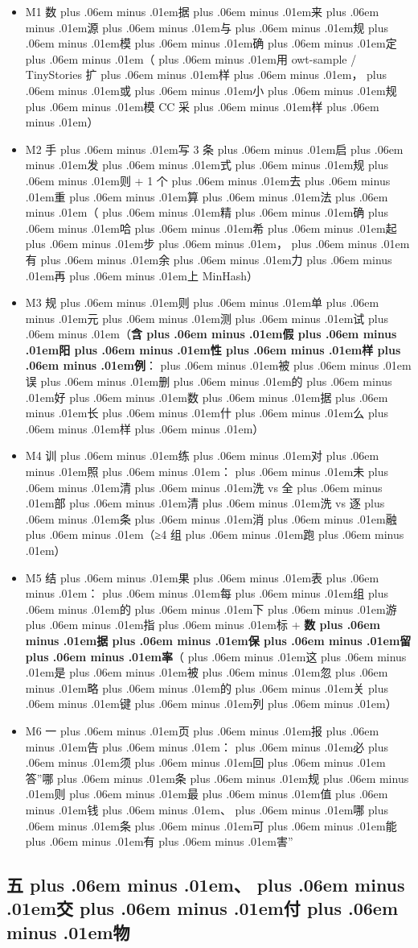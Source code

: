 \documentclass[
]{article}
\providecommand{\tightlist}{%
  \setlength{\itemsep}{0pt}\setlength{\parskip}{0pt}}
\def\zh#1{{\zhfont #1}}
\def\sym#1{{\symfont #1}}
\def\zhglue{\hskip0pt plus .06em minus .01em}
\begin{document}
\begin{itemize}
\tightlist
\item[$\square$]
  M1 \zh{数\zhglue 据\zhglue 来\zhglue 源\zhglue 与\zhglue 规\zhglue 模\zhglue 确\zhglue 定\zhglue （\zhglue 用} owt-sample / TinyStories \zh{扩\zhglue 样\zhglue ，\zhglue 或\zhglue 小\zhglue 规\zhglue 模} CC \zh{采\zhglue 样\zhglue ）}
\item[$\square$]
  M2 \zh{手\zhglue 写} 3 \zh{条\zhglue 启\zhglue 发\zhglue 式\zhglue 规\zhglue 则} + 1 \zh{个\zhglue 去\zhglue 重\zhglue 算\zhglue 法\zhglue （\zhglue 精\zhglue 确\zhglue 哈\zhglue 希\zhglue 起\zhglue 步\zhglue ，\zhglue 有\zhglue 余\zhglue 力\zhglue 再\zhglue 上} MinHash\zh{）}
\item[$\square$]
  M3 \zh{规\zhglue 则\zhglue 单\zhglue 元\zhglue 测\zhglue 试\zhglue （}\textbf{\zh{含\zhglue 假\zhglue 阳\zhglue 性\zhglue 样\zhglue 例}}\zh{：\zhglue 被\zhglue 误\zhglue 删\zhglue 的\zhglue 好\zhglue 数\zhglue 据\zhglue 长\zhglue 什\zhglue 么\zhglue 样\zhglue ）}
\item[$\square$]
  M4 \zh{训\zhglue 练\zhglue 对\zhglue 照\zhglue ：\zhglue 未\zhglue 清\zhglue 洗} vs \zh{全\zhglue 部\zhglue 清\zhglue 洗} vs \zh{逐\zhglue 条\zhglue 消\zhglue 融\zhglue （}\sym{≥}4 \zh{组\zhglue 跑\zhglue ）}
\item[$\square$]
  M5 \zh{结\zhglue 果\zhglue 表\zhglue ：\zhglue 每\zhglue 组\zhglue 的\zhglue 下\zhglue 游\zhglue 指\zhglue 标} + \textbf{\zh{数\zhglue 据\zhglue 保\zhglue 留\zhglue 率}}\zh{（\zhglue 这\zhglue 是\zhglue 被\zhglue 忽\zhglue 略\zhglue 的\zhglue 关\zhglue 键\zhglue 列\zhglue ）}
\item[$\square$]
  M6 \zh{一\zhglue 页\zhglue 报\zhglue 告\zhglue ：\zhglue 必\zhglue 须\zhglue 回\zhglue 答}''\zh{哪\zhglue 条\zhglue 规\zhglue 则\zhglue 最\zhglue 值\zhglue 钱\zhglue 、\zhglue 哪\zhglue 条\zhglue 可\zhglue 能\zhglue 有\zhglue 害}''
\end{itemize}

\subsection{\zh{五\zhglue 、\zhglue 交\zhglue 付\zhglue 物}}\label{ux4e94ux4ea4ux4ed8ux7269}
\end{document}
